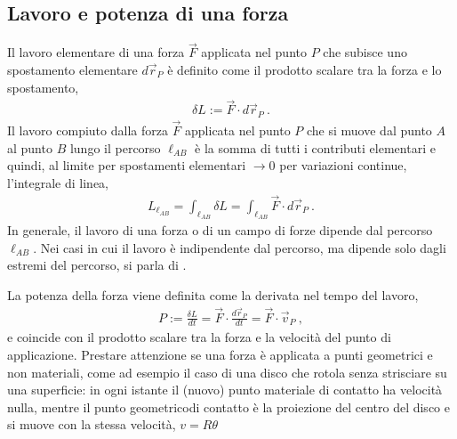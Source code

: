 \documentclass[letterpaper,10pt,italian]{jupyterBook}
\begin{document}
\subsection{Lavoro e potenza di una forza}
\label{\detokenize{ch/mechanics/actions-work:lavoro-e-potenza-di-una-forza}}
\sphinxAtStartPar
{} Il lavoro elementare di una forza \(\vec{F}\) applicata nel punto \(P\) che subisce uno spostamento elementare \(d \vec{r}_P\) è definito come il prodotto scalare tra la forza e lo spostamento,
\begin{equation*}
\begin{split}\delta L := \vec{F} \cdot d \vec{r}_P \ .\end{split}
\end{equation*}
\sphinxAtStartPar
Il lavoro compiuto dalla forza \(\vec{F}\) applicata nel punto \(P\) che si muove dal punto \(A\) al punto \(B\) lungo il percorso \(\ell_{AB}\) è la somma di tutti i contributi elementari \sphinxhyphen{} e quindi, al limite per spostamenti elementari \(\rightarrow 0\) per variazioni continue, l’integrale di linea,
\begin{equation*}
\begin{split}L_{\ell_{AB}} = \int_{\ell_{AB}} \delta L = \int_{\ell_{AB}} \vec{F} \cdot d \vec{r}_{P} \ .\end{split}
\end{equation*}
\sphinxAtStartPar
In generale, il lavoro di una forza o di un campo di forze dipende dal percorso \({\ell}_{AB}\). Nei casi in cui il lavoro è indipendente dal percorso, ma dipende solo dagli estremi del percorso, si parla di {\hyperref[\detokenize{ch/mechanics/actions-conservative:physics-hs-mechanics-actions-conservative}]{}}.

\sphinxAtStartPar
{} La potenza della forza viene definita come la derivata nel tempo del lavoro,
\begin{equation*}
\begin{split}P := \frac{\delta L}{dt} = \vec{F} \cdot \frac{d \vec{r}_P}{d t} = \vec{F} \cdot \vec{v}_P \ , \end{split}
\end{equation*}
\sphinxAtStartPar
e coincide con il prodotto scalare tra la forza e la velocità del punto di applicazione. Prestare attenzione se una forza è applicata a punti geometrici e non materiali, come ad esempio il caso di una disco che rotola senza strisciare su una superficie: in ogni istante il (nuovo) punto materiale di contatto ha velocità nulla, mentre il punto geometricodi contatto è la proiezione del centro del disco e si muove con la stessa velocità, \(v = R \theta\)
\end{document}

